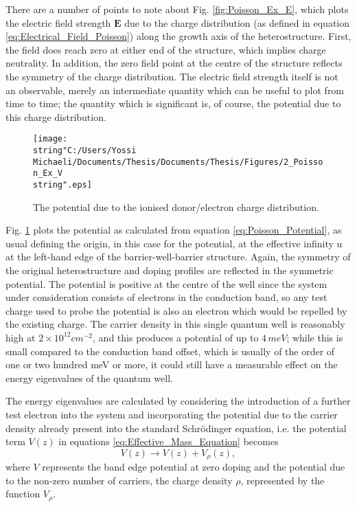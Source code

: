 There are a number of points to note about Fig. \ref{fig:Poisson_Ex_E},
which plots the electric field strength $\mathbf{E}$ due to the charge
distribution (as defined in equation \ref{eq:Electrical_Field_Poisson})
along the growth axis of the heterostructure. First, the field does
reach zero at either end of the structure, which implies charge neutrality.
In addition, the zero field point at the centre of the structure reflects
the symmetry of the charge distribution. The electric field strength
itself is not an observable, merely an intermediate quantity which
can be useful to plot from time to time; the quantity which is significant
is, of course, the potential due to this charge distribution.%
\begin{figure}
\begin{centering}
\texttt{[image: \\string"C:/Users/Yossi Michaeli/Documents/Thesis/Documents/Thesis/Figures/2\_Poisson\_Ex\_V\\string".eps]}
\par\end{centering}

\caption{\label{fig:Poisson_Ex_V}The potential due to the ionised donor/electron
charge distribution.}

\end{figure}
 Fig. \ref{fig:Poisson_Ex_V} plots the potential as calculated from
equation \ref{eq:Poisson_Potential}, as usual defining the origin,
in this case for the potential, at the effective infinity u at the
left-hand edge of the barrier-well-barrier structure. Again, the symmetry
of the original heterostructure and doping profiles are reflected
in the symmetric potential. The potential is positive at the centre
of the well since the system under consideration consists of electrons
in the conduction band, so any test charge used to probe the potential
is also an electron which would be repelled by the existing charge.
The carrier density in this single quantum well is reasonably high
at $2\times10^{12}cm^{-2}$, and this produces a potential of up to
$4\, meV$; while this is small compared to the conduction band offset,
which is usually of the order of one or two hundred meV or more, it
could still have a measurable effect on the energy eigenvalues of
the quantum well.

The energy eigenvalues are calculated by considering the introduction
of a further test electron into the system and incorporating the potential
due to the carrier density already present into the standard Schr\"{o}dinger
equation, i.e. the potential term $V(z)$ in equations \ref{eq:Effective_Mass_Equation}
becomes\begin{equation}
V(z)\rightarrow V(z)+V_{\rho}(z),\end{equation}
where $V$ represents the band edge potential at zero doping and the
potential due to the non-zero number of carriers, the charge density
$\rho$, represented by the function $V_{\rho}$.

